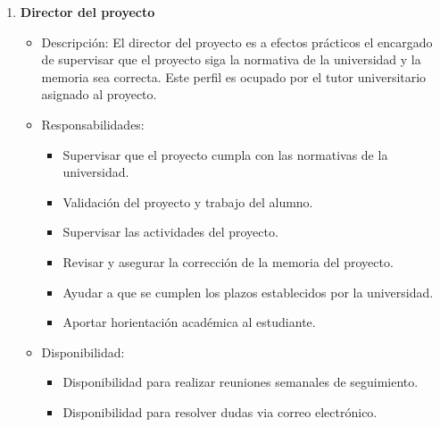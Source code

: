 \begin{enumerate}
    \item \textbf{Director del proyecto}
    \begin{itemize}
        \item Descripción: El director del proyecto es a efectos prácticos el 
        encargado de supervisar que el proyecto siga la normativa de la universidad y la memoria sea correcta.
        Este perfil es ocupado por el tutor universitario asignado al proyecto.
        \item Responsabilidades:
        \begin{itemize}
            \item Supervisar que el proyecto cumpla con las normativas de la universidad.
            \item Validación del proyecto y trabajo del alumno.
            \item Supervisar las actividades del proyecto.
            \item Revisar y asegurar la corrección de la memoria del proyecto.
            \item Ayudar a que se cumplen los plazos establecidos por la universidad.
            \item Aportar horientación académica al estudiante.
        \end{itemize}
        \item Disponibilidad:
        \begin{itemize}
            \item Disponibilidad para realizar reuniones semanales de seguimiento. 
            \item Disponibilidad para resolver dudas via correo electrónico.
        \end{itemize}
    \end{itemize}
    

\end{enumerate}
